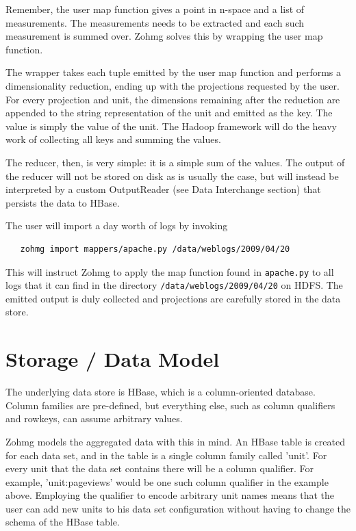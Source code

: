 Remember, the user map function gives a point in n-space and a list of
measurements. The measurements needs to be extracted and each such measurement
is summed over. Zohmg solves this by wrapping the user map function.

The wrapper takes each tuple emitted by the user map function and performs a
dimensionality reduction, ending up with the projections requested by the user.
For every projection and unit, the dimensions remaining after the reduction are
appended to the string representation of the unit and emitted as the key. The
value is simply the value of the unit. The Hadoop framework will do the heavy
work of collecting all keys and summing the values.


The reducer, then, is very simple: it is a simple sum of the values. The output
of the reducer will not be stored on disk as is usually the case, but will
instead be interpreted by a custom OutputReader (see Data Interchange section)
that persists the data to HBase.

The user will import a day worth of logs by invoking

\begin{verbatim}
   zohmg import mappers/apache.py /data/weblogs/2009/04/20
\end{verbatim}

This will instruct Zohmg to apply the map function found in \texttt{apache.py}
to all logs that it can find in the directory \texttt{/data/weblogs/2009/04/20}
on HDFS. The emitted output is duly collected and projections are carefully
stored in the data store.


\section{Storage / Data Model}

The underlying data store is HBase, which is a column-oriented database. Column
families are pre-defined, but everything else, such as column qualifiers and
rowkeys, can assume arbitrary values.

Zohmg models the aggregated data with this in mind. An HBase table is created
for each data set, and in the table is a single column family called 'unit'. For
every unit that the data set contains there will be a column qualifier. For
example, 'unit:pageviews' would be one such column qualifier in the example
above. Employing the qualifier to encode arbitrary unit names means that the
user can add new units to his data set configuration without having to change
the schema of the HBase table.

